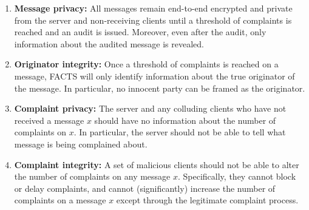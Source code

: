 \begin{enumerate}
    \item \textbf{Message privacy:} All messages remain end-to-end encrypted and private from the server and non-receiving clients until a threshold of complaints is reached and an audit is issued.  Moreover, even after the audit, only information about the audited message is revealed.  
    
    \item \textbf{Originator integrity:}  Once a threshold of complaints is reached on a message, FACTS will only identify information about the true originator of the message.  In particular, no innocent party can be framed as the originator.
    
    \item \textbf{Complaint privacy:} The server and any colluding clients who have not received a message $x$ should have no information about the number of complaints on $x$.  In particular, the server should not be able to tell what message is being complained about.
    
    \item \textbf{Complaint integrity:}  A set of malicious clients should not be able to alter the number of complaints on any message $x$.  Specifically, they cannot block or delay complaints, and cannot (significantly) increase the number of complaints on a message $x$ except through the legitimate complaint process.
\end{enumerate}



